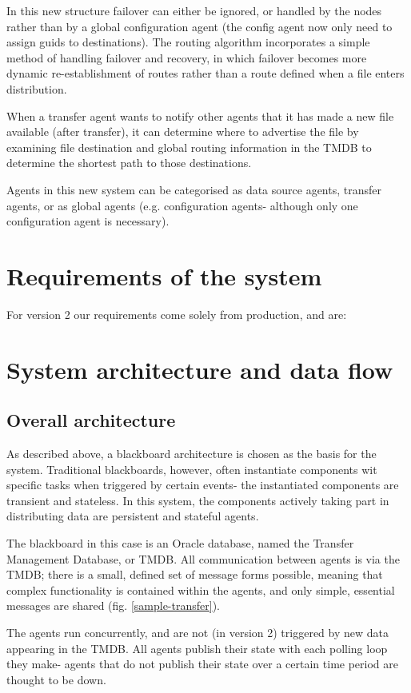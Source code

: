 \documentclass{cmspaper}
\begin{document}
In this new structure failover can either be ignored, or handled by the nodes rather than by a global configuration agent (the config agent now only need to assign guids to destinations).  The routing algorithm incorporates a simple method of handling failover and recovery, in which failover becomes more dynamic re-establishment of routes rather than a route defined when a file enters distribution.

When a transfer agent wants to notify other agents that it has made a new file available (after transfer), it can determine where to advertise the file by examining file destination and global routing information in the TMDB to determine the shortest path to those destinations.

Agents in this new system can be categorised as data source agents, transfer agents, or as global agents (e.g. configuration agents- although only one configuration agent is necessary).

\section{Requirements of the system}
For version 2 our requirements come solely from production, and are:

\section{System architecture and data flow}
\subsection{Overall architecture}
As described above, a blackboard architecture is chosen as the basis for the system. Traditional blackboards, however, often instantiate components wit specific tasks when triggered by certain events- the instantiated components are transient and stateless. In this system, the components actively taking part in distributing data are persistent and stateful agents. 

The blackboard in this case is an Oracle database, named the Transfer Management Database, or TMDB. All communication between agents is via the TMDB; there is a small, defined set of message forms possible, meaning that complex functionality is contained within the agents, and only simple, essential messages are shared (fig. \ref{sample-transfer}).

The agents run concurrently, and are not (in version 2) triggered by new data appearing in the TMDB.  All agents publish their state with each polling loop they make- agents that do not publish their state over a certain time period are thought to be down.
\end{document}
